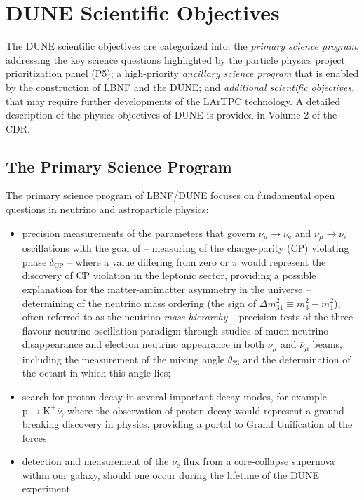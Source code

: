 \section{DUNE Scientific Objectives}

The DUNE scientific objectives are categorized into: the \textit{primary science program}, addressing the key science questions 
highlighted by the particle physics project prioritization panel (P5); 
a high-priority \textit{ancillary science program} that is 
enabled by the construction of LBNF and the DUNE; and \textit{additional scientific objectives}, that may require further developments 
of the LArTPC technology. A detailed description of the physics objectives of DUNE is provided in Volume 2 of the CDR.


\subsection{The Primary Science Program}

The primary science program of LBNF/DUNE  focuses on fundamental open questions in neutrino and astroparticle physics: 
\begin{itemize}
  \item precision measurements of the parameters that govern $\nu_{\mu} \rightarrow \nu_\text{e}$ and
           $\overline{\nu}_{\mu} \rightarrow \overline{\nu}_\text{e}$ oscillations with the goal of
  \subitem -- measuring of the charge-parity (CP) violating phase $\delta_\text{CP}$ -- where a value differing from zero or $\pi$ would represent the discovery of CP violation in the leptonic sector, providing a possible explanation for the matter-antimatter asymmetry in the universe
  \subitem -- determining of the neutrino mass ordering (the sign of $\Delta m^2_{31} \equiv m_3^2-m_1^2$), often referred to as the neutrino \textit{mass hierarchy}
  \subitem -- precision tests of the three-flavour neutrino oscillation paradigm through studies of muon neutrino disappearance 
    and electron neutrino appearance in both $\nu_\mu$ and $\overline{\nu}_{\mu}$ beams, including the 
    measurement of the mixing angle $\theta_{23}$ and the determination of the octant in which this angle lies;
    \item search for proton decay in several important decay modes, for example $\text{p}\rightarrow\text{K}^+\overline{\nu}$, where the observation of proton decay would represent a ground-breaking discovery in physics, providing a portal to Grand Unification of the forces
    \item detection and measurement of the $\nu_\text{e}$ flux from a core-collapse supernova within our galaxy, should one occur during the lifetime of the DUNE experiment
\end{itemize}

